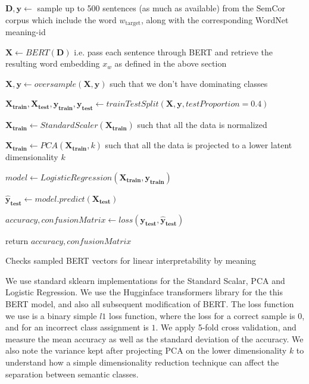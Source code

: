 \documentclass[a4paper,12pt,twoside,openright]{report}
\begin{document}
\begin{algorithm}[H]
\SetAlgoLined
{}
 $\mathbf{D}, \mathbf{y} \leftarrow $  sample up to 500 sentences (as much as available) from the SemCor corpus which include the word $w_{\text{target}}$, along with the corresponding WordNet meaning-id\;

$ \mathbf{X} \leftarrow BERT( \mathbf{D} )$ i.e. pass each sentence through BERT and retrieve the resulting word embedding $x_w$ as defined in the above section\;
 
$ \mathbf{X}, \mathbf{y} \leftarrow oversample( \mathbf{X}, \mathbf{y} )$ such that we don't have dominating classes\;
 
$ \mathbf{X_\text{train}}, \mathbf{X_\text{test}}, \mathbf{y_\text{train}}, \mathbf{y_\text{test}} \leftarrow trainTestSplit( \mathbf{X}, \mathbf{y}, testProportion=0.4 )$ \;

$ \mathbf{X_\text{train}} \leftarrow StandardScaler( \mathbf{X_\text{train}})$ such that all the data is normalized\;

$ \mathbf{X_\text{train}} \leftarrow PCA( \mathbf{X_\text{train}}, k )$ such that all the data is projected to a lower latent dimensionality $k$\;

$ model \leftarrow LogisticRegression( \mathbf{X_\text{train}}, \mathbf{y_\text{train}} )$ \;
    
$ \mathbf{\hat{y}_\text{test}} \leftarrow model.predict(\mathbf{X_\text{test}})$ \;

$ accuracy, confusionMatrix \leftarrow loss(\mathbf{y_\text{test}}, \mathbf{\hat{y}_\text{test}}) $ \;
    
return $ accuracy, confusionMatrix $\;
    
 \caption{Checks sampled BERT vectors for linear interpretability by meaning}
\end{algorithm}

We use standard sklearn \cite{scikit-learn} implementations for the Standard Scalar, PCA and Logistic Regression. 
We use the Hugginface transformers library \cite{Wolf2019} for the this BERT model, and also all subsequent modification of BERT.
The loss function we use is a binary simple $l1$ loss function, where the loss for a correct sample is $0$, and for an incorrect class assignment is $1$.
We apply 5-fold cross validation, and measure the mean accuracy as well as the standard deviation of the accuracy. 
We also note the variance kept after projecting PCA on the lower dimensionality $k$ to understand how a simple dimensionality reduction technique can affect the separation between semantic classes.
\end{document}
